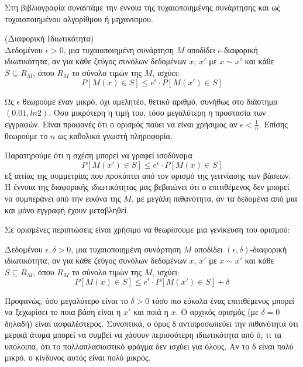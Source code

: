 Στη βιβλιογραφία συναντάμε την έννοια της τυχαιοποιημένης συνάρτησης και ως τυχαιοποιημένου αλγορίθμου ή μηχανισμου.

\begin{definition}(Διαφορική Ιδιωτικότητα)\\
Δεδομένου $\epsilon >0$, μια τυχαιοποιημένη συνάρτηση $M$ αποδίδει   
$\epsilon$-διαφορική ιδιωτικότητα, αν για κάθε ζεύγος συνόλων δεδομένων $x$, $x'$ με $x\sim x'$ και κάθε $S\subseteq R_M$, όπου $R_M$ το σύνολο τιμών της $M$, ισχύει:
$$ P[M(x)\in S]\leq e^{\epsilon} \cdot P[M(x')\in S]$$

\end{definition}

Ως $\epsilon$ θεωρούμε έναν μικρό, όχι αμελητέο, θετικό αριθμό, συνήθως στο διάστημα $(0.01,ln2)$. Όσο μικρότερη η τιμή του, τόσο μεγαλύτερη η προστασία των εγγραφών. Είναι προφανές ότι ο ορισμός παύει να είναι χρήσιμος αν $\epsilon < \frac{1}{n}$. Επίσης θεωρούμε το $n$ ως καθολικά γνωστή πληροφορία.

Παρατηρούμε ότι η σχέση μπορεί να γραφεί ισοδύναμα
$$ P[M(x')\in S]\leq e^{\epsilon} \cdot P[M(x)\in S]$$
εξ αιτίας της συμμετρίας που προκύπτει από τον ορισμό της γειτνίασης των βάσεων. Η έννοια της διαφορικής ιδιωτικότητας μας βεβαιώνει ότι ο επιτιθέμενος δεν μπορεί να συμπεράνει από την εικόνα της $M$, με μεγάλη πιθανότητα, αν τα δεδομένα από μια και μόνο εγγραφή έχουν μεταβληθεί. 

Σε ορισμένες περιπτώσεις είναι χρήσιμο να θεωρίσουμε μια γενίκευση του ορισμού:

\begin{definition}
Δεδομένου $\epsilon, \delta >0$, μια τυχαιοποιημένη συνάρτηση $M$ αποδίδει   
$(\epsilon,\delta)$-διαφορική ιδιωτικότητα, αν για κάθε ζεύγος συνόλων δεδομένων $x$, $x'$ με $x\sim x'$ και κάθε $S\subseteq R_M$, όπου $R_M$ το σύνολο τιμών της $M$, ισχύει:
$$ P[M(x)\in S]\leq e^{\epsilon} \cdot P[M(x')\in S]+\delta$$

\end{definition}

Προφανώς, όσο μεγαλύτερο είναι το $\delta >0$ τόσο πιο εύκολα ένας επιτιθέμενος μπορεί να ξεχωρίσει το ποια βάση είναι η $x'$ και ποιά η $x$. Ο αρχικός ορισμός (με $\delta =0$ δηλαδή) είναι ασφαλέστερος. Συνοπτικά, ο όρος δ αντιπροσωπεύει την πιθανότητα ότι μερικά άτομα μπορεί να συμβεί να χάσουν περισσότερη ιδιωτικότητα από ό, τι τα υπόλοιπα, ότι το πολλαπλασιαστικό φράγμα δεν ισχύει για όλους. Αν το δ είναι πολύ μικρό, ο κίνδυνος αυτός είναι πολύ μικρός.




